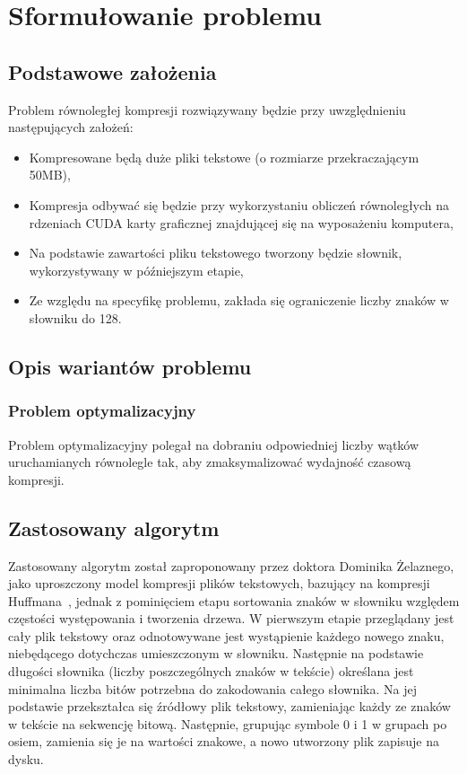 \documentclass[12pt,a4paper,titlepage]{article}
\begin{document}
\section{Sformułowanie problemu}

\subsection{Podstawowe założenia}
Problem równoległej kompresji rozwiązywany będzie przy uwzględnieniu następujących założeń:
\begin{itemize}
    \item Kompresowane będą duże pliki tekstowe (o rozmiarze przekraczającym 50MB),
    \item Kompresja odbywać się będzie przy wykorzystaniu obliczeń równoległych na rdzeniach CUDA karty graficznej znajdującej się na wyposażeniu komputera,
    \item Na podstawie zawartości pliku tekstowego tworzony będzie słownik, wykorzystywany w późniejszym etapie,
    \item Ze względu na specyfikę problemu, zakłada się ograniczenie liczby znaków w słowniku do 128.
\end{itemize}

\subsection{Opis wariantów problemu}

\subsubsection{Problem optymalizacyjny}
Problem optymalizacyjny polegał na dobraniu odpowiedniej liczby wątków uruchamianych równolegle tak, aby zmaksymalizować wydajność czasową kompresji.

\subsection{Zastosowany algorytm}
Zastosowany algorytm został zaproponowany przez doktora Dominika Żelaznego, jako uproszczony model kompresji plików tekstowych, bazujący na kompresji Huffmana~\cite{kompresja-huffmana}, jednak z pominięciem etapu sortowania znaków w słowniku względem częstości występowania i tworzenia drzewa. W pierwszym etapie przeglądany jest cały plik tekstowy oraz odnotowywane jest wystąpienie każdego nowego znaku, niebędącego dotychczas umieszczonym w słowniku. Następnie na podstawie długości słownika (liczby poszczególnych znaków w tekście) określana jest minimalna liczba bitów potrzebna do zakodowania całego słownika. Na jej podstawie przekształca się źródłowy plik tekstowy, zamieniając każdy ze znaków w tekście na sekwencję bitową. Następnie, grupując symbole 0 i 1 w grupach po osiem, zamienia się je na wartości znakowe, a nowo utworzony plik zapisuje na dysku. 
\end{document}

